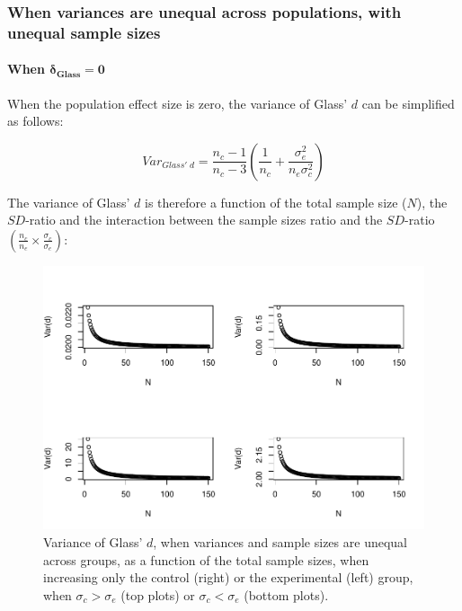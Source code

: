 \documentclass[
  english,
  man,mask]{apa6}
\let\oldparagraph\paragraph
\renewcommand{\paragraph}[1]{\oldparagraph{#1}\mbox{}}
\begin{document}
\hypertarget{when-variances-are-unequal-across-populations-with-unequal-sample-sizes}{%
\subsubsection{When variances are unequal across populations, with unequal sample sizes}\label{when-variances-are-unequal-across-populations-with-unequal-sample-sizes}}

\hypertarget{when-bmdelta_glass-0-1}{%
\paragraph{\texorpdfstring{When \(\bm{\delta_{Glass} = 0}\)}{When \textbackslash bm\{\textbackslash delta\_\{Glass\} = 0\}}}\label{when-bmdelta_glass-0-1}}

When the population effect size is zero, the variance of Glass' \(d\) can be simplified as follows:

\[Var_{Glass' \; d} = \frac{n_c-1}{n_c-3} \left( \frac{1}{n_c}+\frac{\sigma^2_e}{n_e\sigma^2_c}\right)\]

The variance of Glass' \(d\) is therefore a function of the total sample size (\(N\)), the \(SD\)-ratio and the interaction between the sample sizes ratio and the \(SD\)-ratio \(\left(\frac{n_c}{n_e}\times\frac{\sigma_c}{\sigma_e} \right)\):

\begin{figure}
\centering
\includegraphics{Theoretical-Variance-of-all-estimators-as-a-function-of-population-parameters_files/figure-latex/varglassHetunbalNsize2-1.pdf}
\caption{\label{fig:varglassHetunbalNsize2}Variance of Glass' \(d\), when variances and sample sizes are unequal across groups, as a function of the total sample sizes, when increasing only the control (right) or the experimental (left) group, when \(\sigma_c > \sigma_e\) (top plots) or \(\sigma_c < \sigma_e\) (bottom plots).}
\end{figure}
\end{document}
